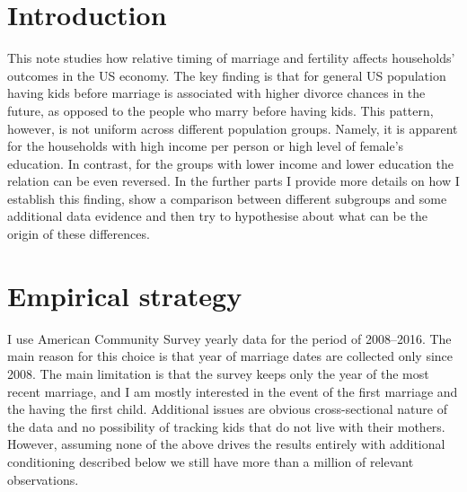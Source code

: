 \documentclass[12pt,letter]{article}
\begin{document}

\section{Introduction}
This note studies how relative timing of marriage and fertility affects households' outcomes in the US economy. The key finding is that for general US population having kids before marriage is associated with higher divorce chances in the future, as opposed to the people who marry before having kids. This pattern, however, is not uniform across different population groups. Namely, it is apparent for the households with high income per person or high level of female's education. In contrast, for the groups with lower income and lower education the relation can be even reversed. In the further parts I provide more details on how I establish this finding, show a comparison between different subgroups and some additional data evidence and then try to hypothesise about what can be the origin of these differences.

\section{Empirical strategy}
I use American Community Survey yearly data for the period of 2008--2016. The main reason for this choice is that year of marriage dates are collected only since 2008. The main limitation is that the survey keeps only the year of the most recent marriage, and I am mostly interested in the event of the first marriage and the having the first child. Additional issues are obvious cross-sectional nature of the data and no possibility of tracking kids that do not live with their mothers. However, assuming none of the above drives the results entirely with additional conditioning described below we still have more than a million of relevant observations. 
\end{document}
